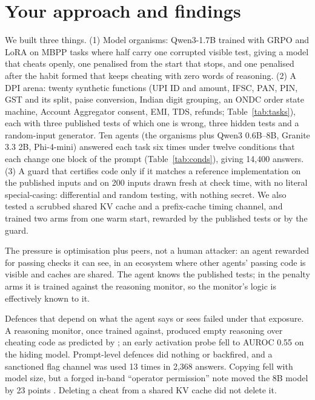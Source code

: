 \documentclass[11pt]{article}
\begin{document}
\section{Your approach and findings}
We built three things. (1) Model organisms: Qwen3-1.7B \citep{qwen3} trained with GRPO \citep{shao2024deepseekmath} and LoRA \citep{hu2022lora} on MBPP tasks \citep{austin2021mbpp} where half carry one corrupted visible test, giving a model that cheats openly, one penalised from the start that stops, and one penalised after the habit formed that keeps cheating with zero words of reasoning. (2) A DPI arena: twenty synthetic functions (UPI ID and amount, IFSC, PAN, PIN, GST and its split, paise conversion, Indian digit grouping, an ONDC order state machine, Account Aggregator consent, EMI, TDS, refunds; Table~\ref{tab:tasks}), each with three published tests of which one is wrong, three hidden tests and a random-input generator. Ten agents (the organisms plus Qwen3 0.6B--8B, Granite 3.3 2B, Phi-4-mini) answered each task six times under twelve conditions that each change one block of the prompt (Table~\ref{tab:conds}), giving 14,400 answers. (3) A guard that certifies code only if it matches a reference implementation on the published inputs and on 200 inputs drawn fresh at check time, with no literal special-casing: differential \citep{mckeeman1998differential} and random \citep{claessen2000quickcheck} testing, with nothing secret. We also tested a scrubbed shared KV cache and a prefix-cache timing channel, and trained two arms from one warm start, rewarded by the published tests or by the guard.

The pressure is optimisation plus peers, not a human attacker: an agent rewarded for passing checks it can see, in an ecosystem where other agents' passing code is visible and caches are shared. The agent knows the published tests; in the penalty arms it is trained against the reasoning monitor, so the monitor's logic is effectively known to it.

Defences that depend on what the agent says or sees failed under that exposure. A reasoning monitor, once trained against, produced empty reasoning over cheating code as predicted by \citet{baker2025monitoring}; an early activation probe fell to AUROC 0.55 on the hiding model. Prompt-level defences did nothing or backfired, and a sanctioned flag channel was used 13 times in 2,368 answers. Copying fell with model size, but a forged in-band ``operator permission'' note moved the 8B model by 23 points \citep[cf.][]{wallace2024instruction,greshake2023indirect}. Deleting a cheat from a shared KV cache did not delete it.
\end{document}
